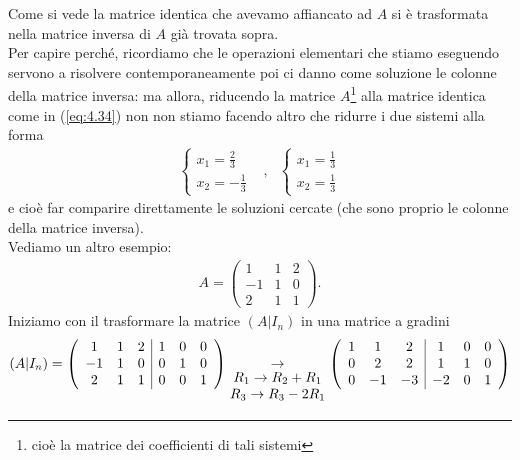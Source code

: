 \documentclass{book}
\begin{document}
Come si vede la matrice identica che avevamo affiancato ad $A$ si è trasformata nella matrice inversa di
$A$ già trovata sopra.\\
Per capire perché, ricordiamo che le operazioni elementari che stiamo eseguendo servono a risolvere
contemporaneamente  poi ci danno come soluzione le colonne della matrice inversa: ma allora, riducendo la matrice
$A$\footnote{cioè la matrice dei coefficienti di tali sistemi} alla matrice identica come in (\ref{eq:4.34}) non
non stiamo facendo altro che ridurre i due sistemi alla forma
\begin{eqnarray*}
  \begin{cases}
    x_1=\frac{2}{3}\\
    x_2=-\frac{1}{3}
  \end{cases}
  &,&
      \begin{cases}
        x_1=\frac{1}{3}\\
        x_2=\frac{1}{3}
      \end{cases}
\end{eqnarray*}
e cioè far comparire direttamente le soluzioni cercate (che sono proprio le colonne della matrice inversa).\\
Vediamo un altro esempio:
\begin{eqnarray*}
  A=\begin{pmatrix}
      1 &1 &2\\
      -1 & 1 &0\\
      2 & 1 &1
  \end{pmatrix}.
\end{eqnarray*}
Iniziamo con il trasformare la matrice $(A|I_n)$ in una matrice a gradini
\begin{equation*}
  (A|I_n)=
  \left(
  \begin{array}[center]{ccc|ccc}
    1 & 1 & 2 &1 &0&0\\
    -1 & 1 &0 & 0&1&0\\
    2 &1 &1&0&0&1
  \end{array}\right)
  \underset{
  \begin{matrix}
    R_1\to R_2+R_1\\ R_3\to  R_3-2R_1
  \end{matrix}}{\to}
  \left(
  \begin{array}{ccc|ccc}
     1 & 1 & 2 &1 &0&0\\
    0 & 2 &2 & 1&1&0\\
     0 & -1 &-3&-2&0&1
  \end{array}\right)
\end{equation*}
\end{document}
